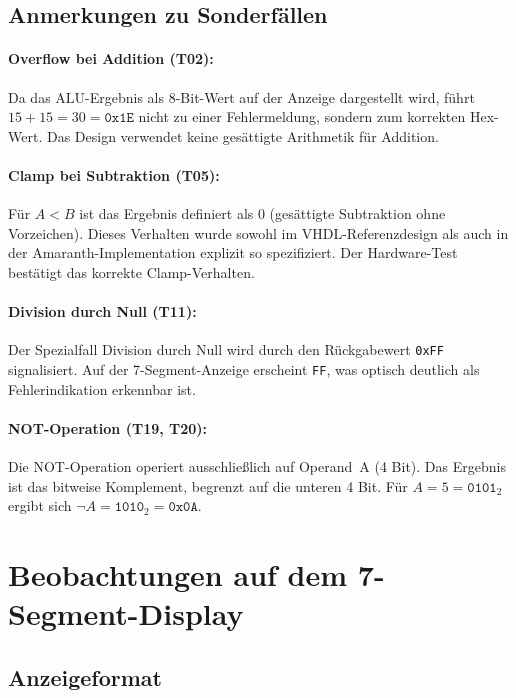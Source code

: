 ﻿\documentclass[12pt,a4paper]{report}
\begin{document}
\subsection{Anmerkungen zu Sonderfällen}
\label{subsec:sonderfaelle}

\paragraph{Overflow bei Addition (T02):}
Da das ALU-Ergebnis als 8-Bit-Wert auf der Anzeige dargestellt wird, führt $15 + 15 = 30 = \texttt{0x1E}$ nicht zu einer Fehlermeldung, sondern zum korrekten Hex-Wert. Das Design verwendet keine gesättigte Arithmetik für Addition.

\paragraph{Clamp bei Subtraktion (T05):}
Für $A < B$ ist das Ergebnis definiert als $0$ (gesättigte Subtraktion ohne Vorzeichen). Dieses Verhalten wurde sowohl im VHDL-Referenzdesign als auch in der Amaranth-Implementation explizit so spezifiziert. Der Hardware-Test bestätigt das korrekte Clamp-Verhalten.

\paragraph{Division durch Null (T11):}
Der Spezialfall Division durch Null wird durch den Rückgabewert \texttt{0xFF} signalisiert. Auf der 7-Segment-Anzeige erscheint \texttt{FF}, was optisch deutlich als Fehlerindikation erkennbar ist.

\paragraph{NOT-Operation (T19, T20):}
Die NOT-Operation operiert ausschließlich auf Operand~A (4 Bit). Das Ergebnis ist das bitweise Komplement, begrenzt auf die unteren 4 Bit. Für $A = 5 = \texttt{0101}_2$ ergibt sich $\lnot A = \texttt{1010}_2 = \texttt{0x0A}$.

\section{Beobachtungen auf dem 7-Segment-Display}
\label{sec:display_beobachtungen}

\subsection{Anzeigeformat}
\label{subsec:anzeigeformat}
\end{document}
